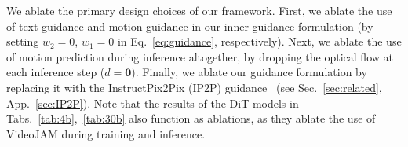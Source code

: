 \begin{table}[t!]
\vspace{-6px}
    \caption{\textbf{Ablation study.} Ablations of the primary components of our framework on VideoJAM-4B using VideoJAM-bench. Human evaluation shows percentage of votes favoring VideoJAM.}
  \label{tab:ablations}
  \centering
    \setlength{\tabcolsep}{1.5pt}
    \vspace{-16px}
\end{table}

 We ablate the primary design choices of our framework. First, we ablate the use of text guidance and motion guidance in our inner guidance formulation (by setting $w_2=0$, $w_1=0$ in Eq.~\ref{eq:guidance}, respectively). Next, we ablate the use of motion prediction during inference altogether, by dropping the optical flow at each inference step ($d=\textbf{0}$). Finally, we ablate our guidance formulation by replacing it with the InstructPix2Pix (IP2P) guidance~\cite{brooks2022instructpix2pix} (see Sec.~\ref{sec:related}, App.~\ref{sec:IP2P}). Note that the results of the DiT models in Tabs.~\ref{tab:4b},~\ref{tab:30b} also function as ablations, as they ablate the use of VideoJAM during training and inference.

